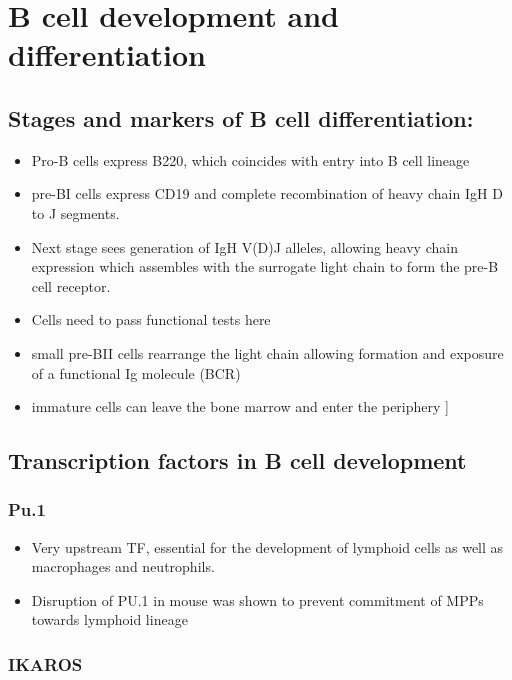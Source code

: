\documentclass[12pt]{article}
\begin{document}
	\section{B cell development and differentiation}
	
	\subsection{Stages and markers of B cell differentiation:}
	
	\begin{itemize}
		\item Pro-B cells express B220, which coincides with entry into B cell lineage
		\item pre-BI cells express CD19 and complete recombination of heavy chain IgH D to J segments. 
		\item Next stage sees generation of IgH V(D)J alleles, allowing heavy chain expression which assembles with the surrogate light chain to form the pre-B cell receptor.
		\item Cells need to pass functional tests here
		\item small pre-BII cells rearrange the light chain allowing formation and exposure of a functional Ig molecule (BCR)
		\item immature cells can leave the bone marrow and enter the periphery \citep{Choukrallah14}]
	\end{itemize}
	
	\subsection{Transcription factors in B cell development}
	
	\subsubsection{Pu.1}
	
	\begin{itemize}
		\item Very upstream TF, essential for the development of lymphoid cells as well as macrophages and neutrophils. 
		\item Disruption of PU.1 in mouse was shown to prevent commitment of MPPs towards lymphoid lineage
	\end{itemize}
	
	\subsubsection{IKAROS}
	
\end{document}
